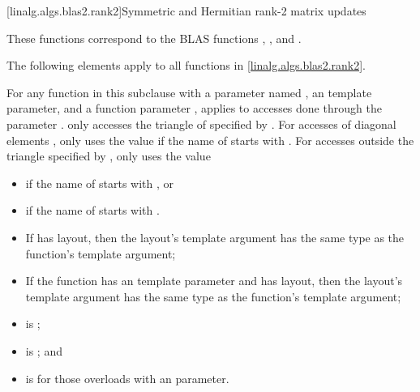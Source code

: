 [linalg.algs.blas2.rank2]{Symmetric and Hermitian rank-2 matrix updates}

\pnum
\begin{note}
These functions correspond to the BLAS functions
, ,  and \supercite{blas2}.
\end{note}

\pnum
The following elements apply to all functions in \ref{linalg.algs.blas2.rank2}.

\pnum
For any function  in this subclause with
a parameter named ,
an  template parameter, and
a function parameter ,
 applies to accesses done through the parameter .
 only accesses the triangle of  specified by .
For accesses of diagonal elements ,
 only uses the value 
if the name of  starts with .
For accesses  outside the triangle specified by ,
 only uses the value
\begin{itemize}
\item
{}
if the name of  starts with , or
\item
{}
if the name of  starts with .
\end{itemize}

\pnum
\mandates
\begin{itemize}
\item
If  has  layout,
then the layout's  template argument has
the same type as the function's  template argument;
\item
If the function has an  template parameter and
 has  layout,
then the layout's  template argument has
the same type as the function's  template argument;
\item
{}
is ;
\item
{}
is ; and
\item
{}
is  for those overloads with an  parameter.
\end{itemize}

